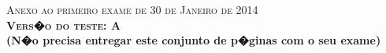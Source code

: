 \documentclass{docist}
\begin{document}
\thispagestyle{empty}

\begin{center}
  {\Large \textsc{Anexo ao primeiro exame de 30 de Janeiro de 2014\\[2ex]
      \textbf{Vers�o do teste: A}\\[2ex]}}
  {\normalsize  \textbf{(N�o precisa entregar este conjunto de p�ginas com o seu exame)}}
\end{center}




\qGPCarbonBufferInterface

\qGPCCView

\qGPComposerUIPerformance

\qMWLowCost

\qMWTactics

\qMWReliabilityImplementation

\qMWReliabilityReadsTactic

\qMWVerBlobTactic

\qCHQualities

\qCHPerformanceQualityTwo

\qCHAmazonSilk

\qCHRenderStyle

\qCHPrerenderTactics

\qCHOmniboxQualities

\qGMRestInteroperability

\qGMPipesFilters

\qGMDataModel

\qGMPerformance

\qGMReliabilityBounce

\qGMSwitchboard

\qFenixThree

\qFenixOne

\qInternationalizationTactics

\qIdentityMap

\qAvailabilityDefensive

\qObserverUses

\qUsesLayers

\qSeveralStylesView

\qApplyUses

\qEnterpriseWide
\end{document}
